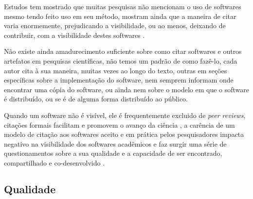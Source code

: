 Estudos tem mostrado que muitas pesquisas não mencionam o uso de softwares
mesmo tendo feito uso em seu método, mostram ainda que a maneira de citar
varia enormemente, prejudicando a visibilidade, ou ao menos, deixando de
contribuir, com a visibilidade destes softwares \cite{howison2016software}.

Não existe ainda amadurecimento suficiente sobre como citar softwares e
outros artefatos em pesquisas científicas, não temos um padrão de como fazê-lo,
cada autor cita à sua maneira, muitas vezes ao longo do texto, outras em seções
específicas sobre a implementação do software, nem semprem informam onde
encontrar uma cópia do software, ou ainda nem sobre o modelo em que o software
é distribuído, ou se é de alguma forma distribuído ao público.


Quando um software não é visível, ele é frequentemente excluido de {\it peer
reviews}, citações formais facilitam e promovem o avanço da ciência \cite{allen2014credit}, a carência
de um modelo de citação aos softwares aceito e em prática pelos pesquisadores
impacta negativo na visibilidade dos softwares acadêmicos e faz surgir uma
série de questionamentos sobre a sua qualidade e a capacidade de ser
encontrado, compartilhado e co-desenvolvido \cite{howison2013,
katz2014transitive} \cite{howison2016software}.



\subsection{Qualidade}

